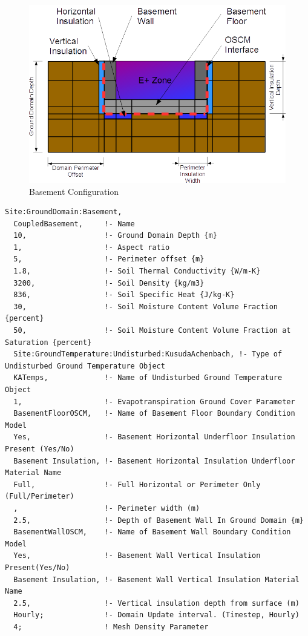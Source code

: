 \begin{figure}[htbp]
\centering
\includegraphics{media/image900.png}
\caption{Basement Configuration \protect \label{fig:basement-configuration}}
\end{figure}

\begin{lstlisting}
Site:GroundDomain:Basement,
  CoupledBasement,     !- Name
  10,                  !- Ground Domain Depth {m}
  1,                   !- Aspect ratio
  5,                   !- Perimeter offset {m}
  1.8,                 !- Soil Thermal Conductivity {W/m-K}
  3200,                !- Soil Density {kg/m3}
  836,                 !- Soil Specific Heat {J/kg-K}
  30,                  !- Soil Moisture Content Volume Fraction {percent}
  50,                  !- Soil Moisture Content Volume Fraction at Saturation {percent}
  Site:GroundTemperature:Undisturbed:KusudaAchenbach, !- Type of Undisturbed Ground Temperature Object
  KATemps,             !- Name of Undisturbed Ground Temperature Object
  1,                   !- Evapotranspiration Ground Cover Parameter
  BasementFloorOSCM,   !- Name of Basement Floor Boundary Condition Model
  Yes,                 !- Basement Horizontal Underfloor Insulation Present (Yes/No)
  Basement Insulation, !- Basement Horizontal Insulation Underfloor Material Name
  Full,                !- Full Horizontal or Perimeter Only (Full/Perimeter)
  ,                    !- Perimeter width (m)
  2.5,                 !- Depth of Basement Wall In Ground Domain {m}
  BasementWallOSCM,    !- Name of Basement Wall Boundary Condition Model
  Yes,                 !- Basement Wall Vertical Insulation Present(Yes/No)
  Basement Insulation, !- Basement Wall Vertical Insulation Material Name
  2.5,                 !- Vertical insulation depth from surface (m)
  Hourly;              !- Domain Update interval. (Timestep, Hourly)
  4;                   ! Mesh Density Parameter
\end{lstlisting}

